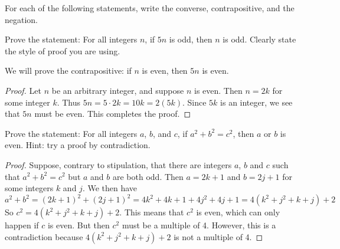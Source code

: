 \documentclass[10pt]{exam}
\def\and{\wedge}
\def\imp{\rightarrow}
\begin{document}
\begin{questions}
\question[6] For each of the following statements, write the converse, contrapositive, and the negation.

\question[5] Prove the statement: For all integers $n$, if $5n$ is odd, then $n$ is odd.  Clearly state the style of proof you are using.
\begin{solution}
We will prove the contrapositive: if $n$ is even, then $5n$ is even.
  \begin{proof}
    Let $n$ be an arbitrary integer, and suppose $n$ is even.  Then $n = 2k$ for some integer $k$.  Thus $5n = 5\cdot 2k = 10k = 2(5k)$.  Since $5k$ is an integer, we see that $5n$ must be even.  This completes the proof.
  \end{proof}

\end{solution}


\question[5] Prove the statement: For all integers $a$, $b$, and $c$, if $a^2 + b^2 = c^2$, then $a$ or $b$ is even.  Hint: try a proof by contradiction.
\begin{solution}
  \begin{proof}
    Suppose, contrary to stipulation, that there are integers $a$, $b$ and $c$ such that $a^2 + b^2 = c^2$ but $a$ and $b$ are both odd.  Then $a = 2k+1$ and $b = 2j + 1$ for some integers $k$ and $j$.  We then have
    \[a^2 + b^2 = (2k+1)^2 + (2j+1)^2 = 4k^2 + 4k + 1 + 4j^2 + 4j + 1 = 4(k^2 + j^2 + k + j) + 2\]
    So $c^2 = 4(k^2 + j^2 + k + j) + 2$.  This means that $c^2$ is even, which can only happen if $c$ is even.  But then $c^2$ must be a multiple of 4.  However, this is a contradiction because $4(k^2 + j^2 + k + j) + 2$ is not a multiple of 4.
  \end{proof}


\end{solution}
\end{questions}
\end{document}
